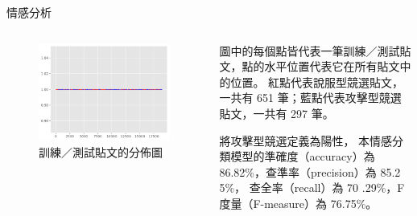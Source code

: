 \documentclass{beamer}
\begin{document}
\begin{CJK}{UTF8}{bkai}
\begin{frame}{情感分析}
\begin{columns}
\begin{column}{.55\textwidth}
  \begin{figure}
    \includegraphics[width=\textwidth, height=\textheight, keepaspectratio]{meta}
    \caption{訓練／測試貼文的分佈圖}
  \end{figure}
\end{column}
\begin{column}{.40\textwidth}
  \qquad 圖中的每個點皆代表一筆訓練／測試貼文，點的水平位置代表它在所有貼文中的位置。%
  紅點代表說服型競選貼文，一共有 651 筆；藍點代表攻擊型競選貼文，一共有 297 筆。\par
  \qquad 將攻擊型競選定義為陽性，%
  本情感分類模型的準確度（accuracy）為 86.82\%，查準率（precision）為 85.2 5\%，%
  查全率（recall）為 70 .29\%，F 度量（F-measure）為 76.75\%。\par
\end{column}
\end{columns}
\end{frame}


\end{CJK}
\end{document}
